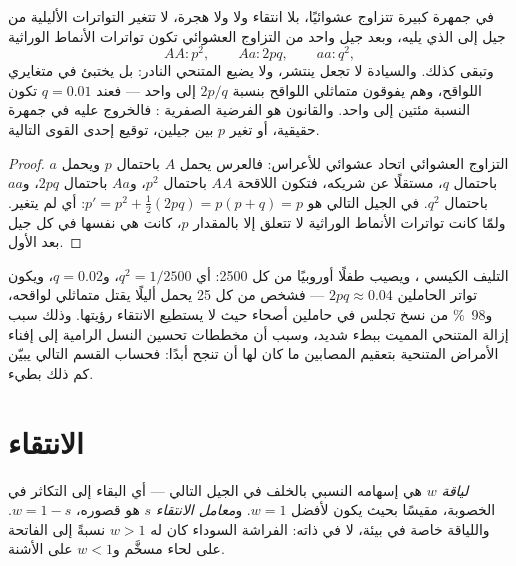 \begin{theorem}\label{thm:b2:population-genetics:hw}
في جمهرة كبيرة تتزاوج عشوائيًا، بلا انتقاء ولا 
ولا هجرة، لا تتغير التواترات الأليلية من جيل
إلى الذي يليه، وبعد جيل واحد من التزاوج
العشوائي تكون تواترات الأنماط الوراثية
\[
AA : p^{2}, \qquad Aa : 2pq, \qquad aa : q^{2},
\]
وتبقى كذلك. والسيادة لا تجعل   ينتشر، ولا
يضيع  المتنحي النادر: بل يختبئ في متغايري اللواقح،
وهم يفوقون متماثلي اللواقح بنسبة $2p/q$ إلى واحد --- فعند $q = 0.01$
تكون النسبة مئتين إلى واحد. والقانون هو الفرضية الصفرية : فالخروج عليه في جمهرة حقيقية، أو تغير
$p$ بين جيلين، توقيع إحدى القوى
التالية.
\end{theorem}
\begin{proof}
التزاوج العشوائي اتحاد عشوائي للأعراس: فالعرس يحمل $A$
باحتمال $p$ ويحمل $a$ باحتمال $q$، مستقلًا عن
شريكه، فتكون اللاقحة $AA$ باحتمال $p^{2}$، و$Aa$ باحتمال
$2pq$، و$aa$ باحتمال $q^{2}$.  في الجيل
التالي هو $p' = p^{2} + \tfrac12(2pq) = p(p + q) = p$: أي لم يتغير.
ولمّا كانت تواترات الأنماط الوراثية لا تتعلق إلا بالمقدار $p$، كانت هي نفسها
في كل جيل بعد الأول.
\end{proof}

\begin{example}\label{ex:b2:population-genetics:cf}
التليف الكيسي ، ويصيب طفلًا أوروبيًا من كل 2500:
أي $q^{2} = 1/2500$، و$q = 0.02$، ويكون تواتر الحاملين $2pq
\approx 0.04$ --- فشخص من كل 25 يحمل أليلًا يقتل
متماثلي لواقحه، و\qty{98}{\%} من نسخ  تجلس في
حاملين أصحاء حيث لا يستطيع الانتقاء رؤيتها. وذلك سبب إزالة
المتنحي المميت ببطء شديد، وسبب أن مخططات تحسين النسل الرامية إلى
إفناء الأمراض المتنحية بتعقيم المصابين ما كان لها أن
تنجح أبدًا: فحساب القسم التالي يبيّن كم ذلك
بطيء.
\end{example}

\section{الانتقاء}

\begin{definition}[اللياقة]\label{def:b2:population-genetics:fitness}
\emph{لياقة}  $w$ هي إسهامه النسبي
بالخلف في الجيل التالي --- أي البقاء إلى التكاثر
في الخصوبة، مقيسًا بحيث يكون لأفضل  $w = 1$. و\emph{معامل
الانتقاء} $s$  هو قصوره،
$w = 1 - s$. واللياقة خاصة  في بيئة،
لا  في ذاته:  الفراشة السوداء كان له $w > 1$
نسبةً إلى الفاتحة على لحاء مسخَّم و$w < 1$ على الأشنة.
\end{definition}

